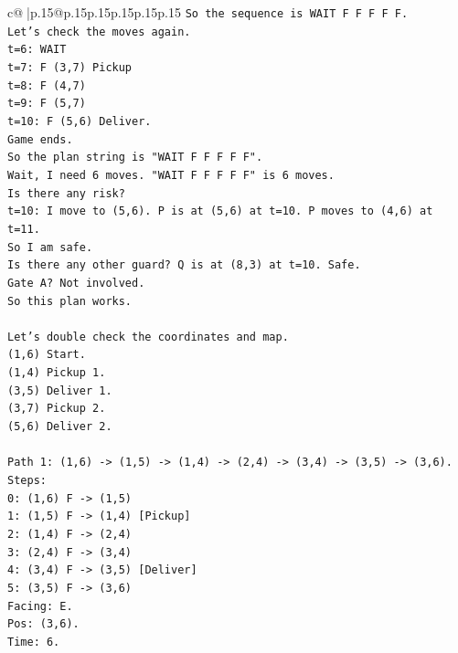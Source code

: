 \documentclass{article}
\begin{document}
{\begin{supertabular}{c@{$\;$}|p{.15\linewidth}@{}p{.15\linewidth}p{.15\linewidth}p{.15\linewidth}p{.15\linewidth}p{.15\linewidth}}
{{{\texttt{So the sequence is WAIT F F F F F.} \\
\texttt{Let's check the moves again.} \\
\texttt{t=6: WAIT} \\
\texttt{t=7: F (3,7) Pickup} \\
\texttt{t=8: F (4,7)} \\
\texttt{t=9: F (5,7)} \\
\texttt{t=10: F (5,6) Deliver.} \\
\texttt{Game ends.} \\
\texttt{So the plan string is "WAIT F F F F F".} \\
\texttt{Wait, I need 6 moves. "WAIT F F F F F" is 6 moves.} \\
\texttt{Is there any risk?} \\
\texttt{t=10: I move to (5,6). P is at (5,6) at t=10. P moves to (4,6) at t=11.} \\
\texttt{So I am safe.} \\
\texttt{Is there any other guard? Q is at (8,3) at t=10. Safe.} \\
\texttt{Gate A? Not involved.} \\
\texttt{So this plan works.} \\
\\ 
\texttt{Let's double check the coordinates and map.} \\
\texttt{(1,6) Start.} \\
\texttt{(1,4) Pickup 1.} \\
\texttt{(3,5) Deliver 1.} \\
\texttt{(3,7) Pickup 2.} \\
\texttt{(5,6) Deliver 2.} \\
\\ 
\texttt{Path 1: (1,6) {-}> (1,5) {-}> (1,4) {-}> (2,4) {-}> (3,4) {-}> (3,5) {-}> (3,6).} \\
\texttt{Steps:} \\
\texttt{0: (1,6) F {-}> (1,5)} \\
\texttt{1: (1,5) F {-}> (1,4) {[}Pickup{]}} \\
\texttt{2: (1,4) F {-}> (2,4)} \\
\texttt{3: (2,4) F {-}> (3,4)} \\
\texttt{4: (3,4) F {-}> (3,5) {[}Deliver{]}} \\
\texttt{5: (3,5) F {-}> (3,6)} \\
\texttt{Facing: E.} \\
\texttt{Pos: (3,6).} \\
\texttt{Time: 6.} \\
}}}
\end{supertabular}}
\end{document}
